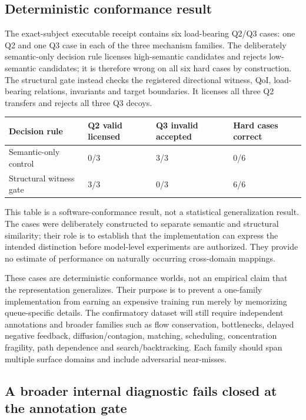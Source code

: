 \subsection{Deterministic conformance result}

The exact-subject executable receipt contains six load-bearing Q2/Q3 cases: one Q2 and one Q3 case in each of the three mechanism families. The deliberately semantic-only decision rule licenses high-semantic candidates and rejects low-semantic candidates; it is therefore wrong on all six hard cases by construction. The structural gate instead checks the registered directional witness, QoI, load-bearing relations, invariants and target boundaries. It licenses all three Q2 transfers and rejects all three Q3 decoys.

\begin{center}
\begin{tabularx}{\linewidth}{@{}lYYY@{}}
\toprule
Decision rule & Q2 valid licensed & Q3 invalid accepted & Hard cases correct \\
\midrule
Semantic-only control & 0/3 & 3/3 & 0/6 \\
Structural witness gate & 3/3 & 0/3 & 6/6 \\
\bottomrule
\end{tabularx}
\end{center}

This table is a software-conformance result, not a statistical generalization result. The cases were deliberately constructed to separate semantic and structural similarity; their role is to establish that the implementation can express the intended distinction before model-level experiments are authorized. They provide no estimate of performance on naturally occurring cross-domain mappings.

These cases are deterministic conformance worlds, not an empirical claim that the representation generalizes. Their purpose is to prevent a one-family implementation from earning an expensive training run merely by memorizing queue-specific details. The confirmatory dataset will still require independent annotations and broader families such as flow conservation, bottlenecks, delayed negative feedback, diffusion/contagion, matching, scheduling, concentration fragility, path dependence and search/backtracking. Each family should span multiple surface domains and include adversarial near-misses.

\subsection{A broader internal diagnostic fails closed at the annotation gate}

